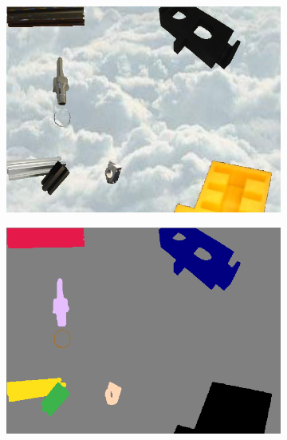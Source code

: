\begin{figure}[h]
\begin{subfigure}{.24\textwidth}
			\includegraphics[width=1\linewidth]{images/sample_predictions/00017}
		\end{subfigure}
		\begin{subfigure}{.24\textwidth}
			\centering
			\includegraphics[width=1\linewidth]{images/sample_predictions/00017_full_gt}
		\end{subfigure}
		\begin{subfigure}{.24\textwidth}
			\centering

\end{subfigure}
\end{figure}
